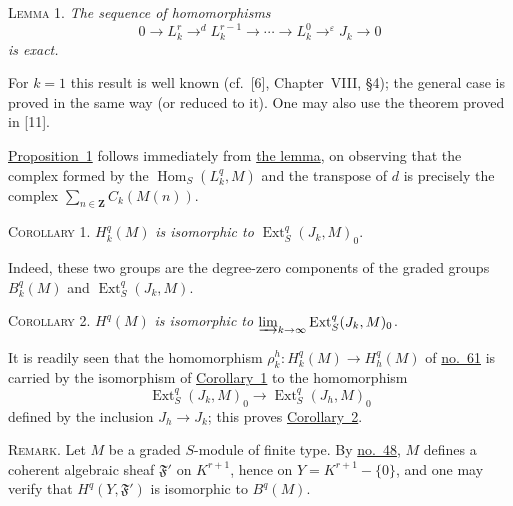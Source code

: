 \label{fac:III:4:no:69:lemma:1}
\textsc{Lemma 1.} \textit{The sequence of homomorphisms}
\label{fac:III:4:no:69:formula:resolution-Jk}
\[
0\longrightarrow L_k^r\mathop{\longrightarrow}^{d}L_k^{r-1}
\longrightarrow\cdots\longrightarrow L_k^0
\mathop{\longrightarrow}^{\varepsilon}J_k\longrightarrow0
\]
\textit{is exact.}

For $k=1$ this result is well known (cf.~[6], Chapter~VIII, \S4); the
general case is proved in the same way (or reduced to it). One may also
use the theorem proved in [11].

\hyperref[fac:III:4:no:69:prop:1]{Proposition~1} follows immediately from
\hyperref[fac:III:4:no:69:lemma:1]{the lemma}, on observing that the complex
formed by the
$\operatorname{Hom}_S(L_k^q,M)$ and the transpose of $d$ is precisely the
complex $\sum_{n\in\mathbf{Z}}C_k(M(n))$.

\label{fac:III:4:no:69:cor:1}
\textsc{Corollary 1.} $H_k^q(M)$ \textit{is isomorphic to}
$\operatorname{Ext}_S^q(J_k,M)_0$.

Indeed, these two groups are the degree-zero components of the graded
groups $B_k^q(M)$ and $\operatorname{Ext}_S^q(J_k,M)$.

\label{fac:III:4:no:69:cor:2}
\textsc{Corollary 2.} $H^q(M)$ \textit{is isomorphic to}
$\varinjlim_{k\to\infty}\operatorname{Ext}_S^q(J_k,M)_0$.

It is readily seen that the homomorphism
\hyperref[fac:III:3:no:61:formula:rho]
{$\rho_k^h:H_k^q(M)\longrightarrow H_h^q(M)$} of
\hyperref[fac:III:3:no:61]{no.~61} is carried by
the isomorphism of \hyperref[fac:III:4:no:69:cor:1]{Corollary~1} to the
homomorphism
\label{fac:III:4:no:69:formula:Ext-transition}
\[
\operatorname{Ext}_S^q(J_k,M)_0\longrightarrow
\operatorname{Ext}_S^q(J_h,M)_0
\]
defined by the inclusion $J_h\longrightarrow J_k$; this proves
\hyperref[fac:III:4:no:69:cor:2]{Corollary~2}.

\label{fac:III:4:no:69:remark}
\textsc{Remark.} Let $M$ be a graded $S$-module of finite type. By
\hyperref[fac:II:4:no:48]{no.~48}, $M$ defines a coherent algebraic sheaf
$\mathfrak F'$ on $K^{r+1}$, hence on $Y=K^{r+1}-\{0\}$, and one may
verify that $H^q(Y,\mathfrak F')$ is isomorphic to $B^q(M)$.
